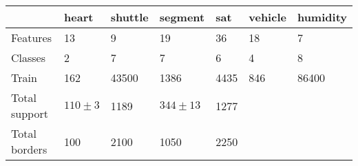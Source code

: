 \begin{tabular}{|l|llllll|}
	\hline
& heart & shuttle & segment & sat & vehicle & humidity \\\hline
Features & 13 & 9 & 19 & 36 & 18 & 7 \\
Classes & 2 & 7 & 7 & 6 & 4 & 8 \\
	Train & 162 & 43500 & 1386 & 4435 & 846 & 86400 \\\hline
	Total support & $110\pm3$ & 1189 & $344\pm13$ & 1277 & & \\\hline
	Total borders & 100 & 2100 & 1050 & 2250 & & &\\\hline
\end{tabular}

